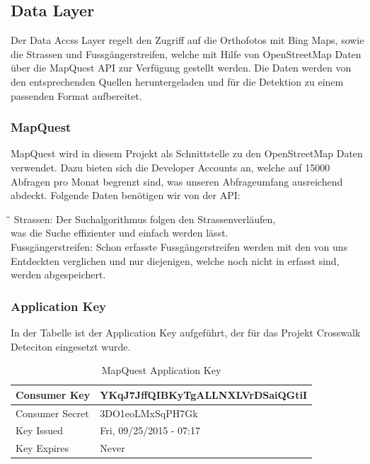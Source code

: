 \subsection{Data Layer}
Der Data Accss Layer regelt den Zugriff auf die Orthofotos mit Bing Maps, sowie die Strassen und Fussgängerstreifen, welche mit Hilfe von OpenStreetMap Daten über die MapQuest API zur Verfügung gestellt werden. Die Daten werden von den entsprechenden Quellen heruntergeladen und für die Detektion zu einem passenden Format aufbereitet.

\subsubsection{MapQuest}
\Gls{MapQuest} \cite{Mapquest} wird in diesem Projekt als Schnittstelle zu den OpenStreetMap Daten verwendet. Dazu bieten sich die Developer Accounts an, welche auf 15000 Abfragen pro Monat begrenzt sind, was unseren Abfrageumfang ausreichend abdeckt.
Folgende Daten benötigen wir von der API:
\begin{tabbing}[H]
    \hspace*{3cm}\=\hspace*{9cm}\= \kill
    Strassen: \> Der Suchalgorithmus folgen den Strassenverläufen, \\
     			\> was die Suche effizienter und einfach werden lässt.\\
    Fussgängerstreifen: \> Schon erfasste Fussgängerstreifen werden mit den von uns  \\ \> Entdeckten verglichen und nur diejenigen, welche noch nicht in erfasst sind,\\ \> werden abgespeichert.
\end{tabbing}


\subsubsection{Application Key}
In der Tabelle ist der Application Key aufgeführt, der für das Projekt Crosswalk Deteciton eingesetzt wurde.
\begin{table}[H]
	\begin{tabular}{ | p{6cm} | p{6cm}  | }
		\hline    
		Consumer Key &  YKqJ7JffQIBKyTgALLNXLVrDSaiQGtiI \\ \hline
		Consumer Secret & 3DO1eoLMxSqPH7Gk \\ \hline
		Key Issued & Fri, 09/25/2015 - 07:17 \\ \hline
		Key Expires & Never \\ \hline
	\end{tabular}
	\caption[MapQuest Application Key]{MapQuest Application Key}
\end{table}

